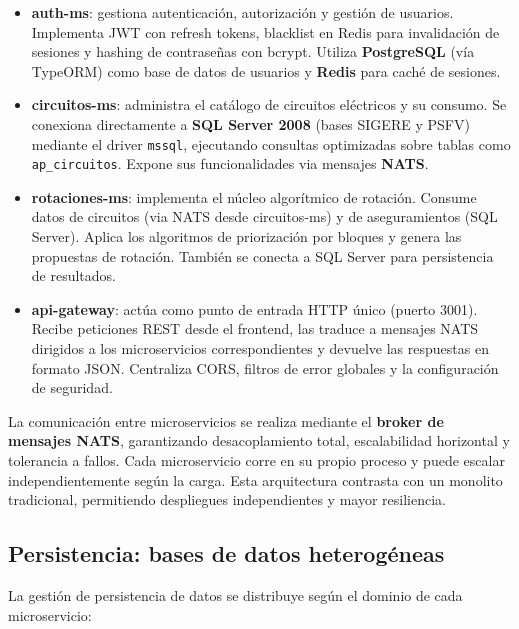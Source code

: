 \begin{itemize}
    \item \textbf{auth-ms}: gestiona autenticación, autorización y gestión de usuarios. Implementa JWT con refresh tokens, blacklist en Redis para invalidación de sesiones y hashing de contraseñas con bcrypt. Utiliza \textbf{PostgreSQL} (vía TypeORM) como base de datos de usuarios y \textbf{Redis} para caché de sesiones.
    
    \item \textbf{circuitos-ms}: administra el catálogo de circuitos eléctricos y su consumo. Se conexiona directamente a \textbf{SQL Server 2008} (bases SIGERE y PSFV) mediante el driver \texttt{mssql}, ejecutando consultas optimizadas sobre tablas como \texttt{ap\_circuitos}. Expone sus funcionalidades via mensajes \textbf{NATS}.
    
    \item \textbf{rotaciones-ms}: implementa el núcleo algorítmico de rotación. Consume datos de circuitos (via NATS desde circuitos-ms) y de aseguramientos (SQL Server). Aplica los algoritmos de priorización por bloques y genera las propuestas de rotación. También se conecta a SQL Server para persistencia de resultados.
    
    \item \textbf{api-gateway}: actúa como punto de entrada HTTP único (puerto 3001). Recibe peticiones REST desde el frontend, las traduce a mensajes NATS dirigidos a los microservicios correspondientes y devuelve las respuestas en formato JSON. Centraliza CORS, filtros de error globales y la configuración de seguridad.
\end{itemize}

La comunicación entre microservicios se realiza mediante el \textbf{broker de mensajes NATS}, garantizando desacoplamiento total, escalabilidad horizontal y tolerancia a fallos. Cada microservicio corre en su propio proceso y puede escalar independientemente según la carga. Esta arquitectura contrasta con un monolito tradicional, permitiendo despliegues independientes y mayor resiliencia.

\subsection{Persistencia: bases de datos heterogéneas}
La gestión de persistencia de datos se distribuye según el dominio de cada microservicio:

